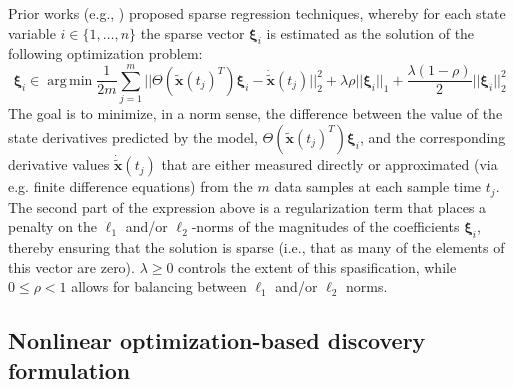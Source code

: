 \documentclass[12pt]{article}
\DeclareMathOperator*{\argmin}{arg\,min}
\begin{document}
Prior works (e.g., \cite{brunton2016discovering,sun2020alven}) proposed sparse regression techniques, whereby  for each  state variable $i \in \{1,\dots,n\}$ the sparse vector $\pmb{\xi}_i$ is estimated as the solution of the following optimization problem:
\begin{equation}
\label{eq:regularized_regression}
\pmb{\xi}_i \in   \argmin \frac{1}{2m} \sum_{j=1}^{m}||\Theta(\tilde{\textbf{x}}(t_j)^T)\pmb{\xi}_i - \dot{\tilde{\textbf{x}}}(t_j) ||_2^2 + \lambda \rho ||\pmb{\xi}_i||_1 + \frac{\lambda(1-\rho)}{2} ||\pmb{\xi}_i||_2^2
\end{equation}
The goal is to minimize, in a norm sense, the difference between the value of the state derivatives predicted by the model, $\Theta(\tilde{\textbf{x}}(t_j)^T)\pmb{\xi}_i$, and the corresponding  derivative values $\dot{\tilde{\textbf{x}}}(t_j)$ that are either measured  directly or approximated  (via e.g. finite difference equations)  from the $m$ data samples at each sample time $t_j$. The second part of the expression above is a regularization term that places a penalty on the   $\ell_1$ and/or  $\ell_2$-norms of the magnitudes of the coefficients $\pmb{\xi}_i$, thereby ensuring that the solution is sparse (i.e., that as many of the elements of this vector are zero).  $\lambda \ge 0$ controls the extent of this spasification, while  $0 \le \rho < 1$ allows for balancing between $\ell_1$ and/or  $\ell_2$ norms.




\subsection*{Nonlinear optimization-based discovery formulation}
\end{document}
